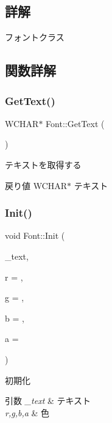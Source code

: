 \subsection{詳解}
フォントクラス 

\subsection{関数詳解}
\mbox{\label{class_font_a47be569e73a4ba819bf4370463cf929b}} 
\subsubsection{\texorpdfstring{Get\+Text()}{GetText()}}
{\footnotesize\ttfamily W\+C\+H\+AR$\ast$ Font\+::\+Get\+Text (\begin{DoxyParamCaption}{ }\end{DoxyParamCaption})\hspace{0.3cm}{\ttfamily [inline]}}



テキストを取得する 

\begin{DoxyReturn}{戻り値}
W\+C\+H\+A\+R$\ast$ テキスト 
\end{DoxyReturn}
\mbox{\label{class_font_a89cf4ba6fb0d3105b1207146e85661c0}} 
\subsubsection{\texorpdfstring{Init()}{Init()}}
{\footnotesize\ttfamily void Font\+::\+Init (\begin{DoxyParamCaption}\item[{W\+C\+H\+AR $\ast$}]{\+\_\+text,  }\item[{float}]{r = {},  }\item[{float}]{g = {},  }\item[{float}]{b = {},  }\item[{float}]{a = {} }\end{DoxyParamCaption})}



初期化 


\begin{DoxyParams}{引数}
{\em \+\_\+text} & テキスト \\
\hline
{\em r,g,b,a} & 色 \\
\hline
\end{DoxyParams}
\mbox{\label{class_font_ad0e36f0066cc8724b6cf6833a15aedbc}} 
